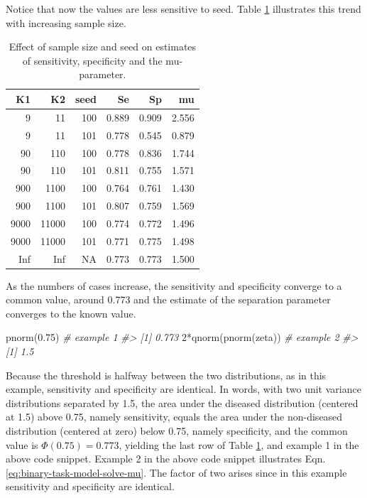\documentclass[
]{book}
\newenvironment{Shaded}{\begin{snugshade}}{\end{snugshade}}
\newcommand{\CommentTok}[1]{\textcolor[rgb]{0.56,0.35,0.01}{\textit{#1}}}
\newcommand{\DecValTok}[1]{\textcolor[rgb]{0.00,0.00,0.81}{#1}}
\newcommand{\FloatTok}[1]{\textcolor[rgb]{0.00,0.00,0.81}{#1}}
\newcommand{\FunctionTok}[1]{\textcolor[rgb]{0.00,0.00,0.00}{#1}}
\newcommand{\NormalTok}[1]{#1}
\newcommand{\SpecialCharTok}[1]{\textcolor[rgb]{0.00,0.00,0.00}{#1}}
\begin{document}
Notice that now the values are less sensitive to seed. Table \ref{tab:binary-task-model-table} illustrates this trend with increasing sample size.

\begin{table}

\caption{\label{tab:binary-task-model-table}Effect of sample size and seed on estimates of sensitivity, specificity and the mu-parameter.}
\centering
\begin{tabular}[t]{r|r|r|r|r|r}
\hline
K1 & K2 & seed & Se & Sp & mu\\
\hline
9 & 11 & 100 & 0.889 & 0.909 & 2.556\\
\hline
9 & 11 & 101 & 0.778 & 0.545 & 0.879\\
\hline
90 & 110 & 100 & 0.778 & 0.836 & 1.744\\
\hline
90 & 110 & 101 & 0.811 & 0.755 & 1.571\\
\hline
900 & 1100 & 100 & 0.764 & 0.761 & 1.430\\
\hline
900 & 1100 & 101 & 0.807 & 0.759 & 1.569\\
\hline
9000 & 11000 & 100 & 0.774 & 0.772 & 1.496\\
\hline
9000 & 11000 & 101 & 0.771 & 0.775 & 1.498\\
\hline
Inf & Inf & NA & 0.773 & 0.773 & 1.500\\
\hline
\end{tabular}
\end{table}

As the numbers of cases increase, the sensitivity and specificity converge to a common value, around 0.773 and the estimate of the separation parameter converges to the known value.

\begin{Shaded}
\begin{Highlighting}[]
\FunctionTok{pnorm}\NormalTok{(}\FloatTok{0.75}\NormalTok{) }\CommentTok{\# example 1}
\CommentTok{\#\textgreater{} [1] 0.773}
\DecValTok{2}\SpecialCharTok{*}\FunctionTok{qnorm}\NormalTok{(}\FunctionTok{pnorm}\NormalTok{(zeta)) }\CommentTok{\# example 2}
\CommentTok{\#\textgreater{} [1] 1.5}
\end{Highlighting}
\end{Shaded}

Because the threshold is halfway between the two distributions, as in this example, sensitivity and specificity are identical. In words, with two unit variance distributions separated by 1.5, the area under the diseased distribution (centered at 1.5) above 0.75, namely sensitivity, equals the area under the non-diseased distribution (centered at zero) below 0.75, namely specificity, and the common value is \(\Phi(0.75)= 0.773\), yielding the last row of Table \ref{tab:binary-task-model-table}, and example 1 in the above code snippet. Example 2 in the above code snippet illustrates Eqn. \eqref{eq:binary-task-model-solve-mu}. The factor of two arises since in this example sensitivity and specificity are identical.
\end{document}
